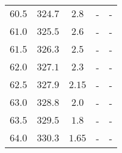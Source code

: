 \begin{table}
\begin{tabular}{c c c c c}
        $\num{60.5}$&$\num{324.7}$&$\num{2.8}$&-&-\\
        $\num{61.0}$&$\num{325.5}$&$\num{2.6}$&-&-\\
        $\num{61.5}$&$\num{326.3}$&$\num{2.5}$&-&-\\
        $\num{62.0}$&$\num{327.1}$&$\num{2.3}$&-&-\\
        $\num{62.5}$&$\num{327.9}$&$\num{2.15}$&-&-\\
        $\num{63.0}$&$\num{328.8}$&$\num{2.0}$&-&-\\
        $\num{63.5}$&$\num{329.5}$&$\num{1.8}$&-&-\\
        $\num{64.0}$&$\num{330.3}$&$\num{1.65}$&-&-\\
        \bottomrule
    \end{tabular}
\end{table}
\newpage




